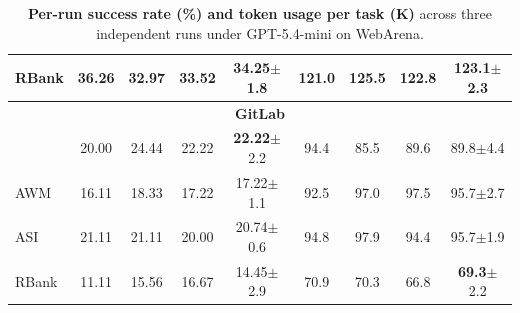 \begin{table}[ht]
\begin{tabular}{lcccccccc}
RBank          & 36.26 & 32.97 & 33.52 & 34.25{\scriptsize $\pm$1.8} & 121.0 & 125.5 & 122.8 & 123.1{\scriptsize $\pm$2.3} \\
\midrule
\multicolumn{9}{c}{\textbf{GitLab}} \\
\midrule
\budgetactor{}      & 20.00 & 24.44 & 22.22 & \textbf{22.22}{\scriptsize $\pm$2.2} & 94.4 & 85.5 & 89.6 & 89.8{\scriptsize $\pm$4.4} \\
AWM            & 16.11 & 18.33 & 17.22 & 17.22{\scriptsize $\pm$1.1} & 92.5 & 97.0 & 97.5 & 95.7{\scriptsize $\pm$2.7} \\
ASI            & 21.11 & 21.11 & 20.00 & 20.74{\scriptsize $\pm$0.6} & 94.8 & 97.9 & 94.4 & 95.7{\scriptsize $\pm$1.9} \\
RBank          & 11.11 & 15.56 & 16.67 & 14.45{\scriptsize $\pm$2.9} & 70.9 & 70.3 & 66.8 & \textbf{69.3}{\scriptsize $\pm$2.2} \\
\bottomrule
\end{tabular}
\caption{\textbf{Per-run success rate (\%) and token usage per task (K)} across three independent runs under GPT-5.4-mini on WebArena.}
\label{tab:variance-gpt}
\end{table}


